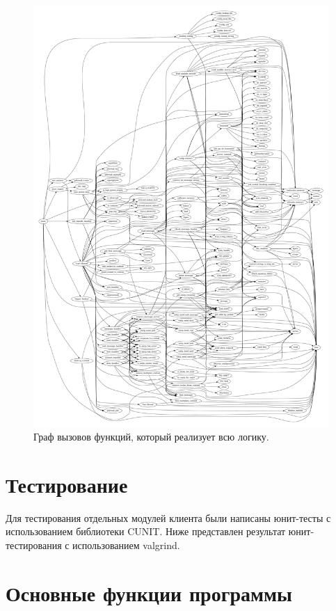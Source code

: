 \documentclass[a4paper,12pt]{report}
\begin{document}
	\begin{figure}[H]
	\centering
	\includegraphics[width=\textwidth]{./include/cflow.pdf}
	\caption{Граф вызовов функций, который реализует всю логику.}
	\label{fig:cflow}
	\end{figure}

	\section{Тестирование}
	
	Для тестирования отдельных модулей клиента были написаны юнит-тесты с использованием библиотеки CUNIT. Ниже представлен результат юнит-тестирования с использованием valgrind. 

	\section{Основные функции программы}
\end{document}
